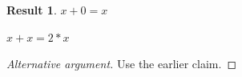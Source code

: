 \newtheorem{result}{Result}

\begin{result}\label{claim:custom}$x+0=x$\end{result}
\begin{theorem}\label{claim:second}$x+x=2*x$\end{theorem}
\begin{proof}[Alternative argument]Use the earlier claim.\end{proof}

